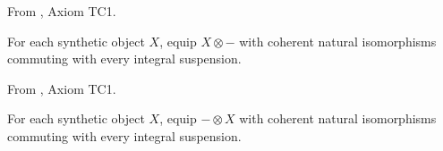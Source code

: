 \begin{definition}
\label{frontier:Literature:320f401ce5e1}
From \cite{May01}, Axiom TC1.\par

For each synthetic object $X$, equip $X\otimes-$ with coherent natural isomorphisms commuting with every integral suspension.
\end{definition}

\begin{definition}
\label{frontier:Literature:4983add560f1}
From \cite{May01}, Axiom TC1.\par

For each synthetic object $X$, equip $-\otimes X$ with coherent natural isomorphisms commuting with every integral suspension.
\end{definition}

